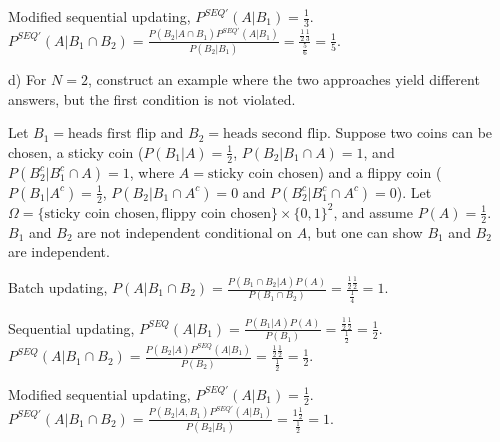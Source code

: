 \documentclass[12pt,english]{article}
\begin{document}
Modified sequential updating, $P^{SEQ'}(A | B_{1}) = \frac{1}{3}$. $P^{SEQ'}(A | B_{1} \cap B_{2}) = \frac{P(B_{2} | A \cap B_{1}) P^{SEQ'}(A | B_{1})}{P(B_{2} | B_{1})} = \frac{\frac{1}{2} \frac{1}{3}}{\frac{5}{6}} = \frac{1}{5}$.

\vspace{1em}

d) For $N = 2$, construct an example where the two approaches yield different answers, but the first condition is not violated.

\vspace{1em}

Let $B_{1} = \text{heads first flip}$ and $B_{2} = \text{heads second flip}$.  Suppose two coins can be chosen, a sticky coin ($P(B_{1} | A) = \frac{1}{2}$, $P(B_{2} | B_{1} \cap A) = 1$, and $P(B_{2}^{c} | B_{1}^{c} \cap A) = 1$, where $A = \text{sticky coin chosen}$) and a flippy coin ($P(B_{1} | A^{c}) = \frac{1}{2}$, $P(B_{2} | B_{1} \cap A^{c}) = 0$ and $P(B_{2}^{c} | B_{1}^{c} \cap A^{c}) = 0$). Let $\Omega = \{\text{sticky coin chosen}, \text{flippy coin chosen} \} \times \{0, 1\}^{2}$, and assume $P(A) = \frac{1}{2}$. $B_{1}$ and $B_{2}$ are not independent conditional on $A$, but one can show $B_{1}$ and $B_{2}$ are independent.

Batch updating, $P(A | B_{1} \cap B_{2}) = \frac{P(B_{1} \cap B_{2} | A) P(A)}{P(B_{1} \cap B_{2})} = \frac{\frac{1}{2} \frac{1}{2}}{\frac{1}{4}} = 1$.

Sequential updating, $P^{SEQ}(A | B_{1}) = \frac{P(B_{1} | A) P(A)}{P(B_{1})} = \frac{\frac{1}{2} \frac{1}{2}}{\frac{1}{2}} = \frac{1}{2}$. $P^{SEQ}(A | B_{1} \cap B_{2}) = \frac{P(B_{2} | A) P^{SEQ}(A | B_{1})}{P(B_{2})} = \frac{\frac{1}{2} \frac{1}{2}}{\frac{1}{2}} = \frac{1}{2}$.

Modified sequential updating, $P^{SEQ'}(A | B_{1}) = \frac{1}{2}$. $P^{SEQ'}(A | B_{1} \cap B_{2}) = \frac{P(B_{2} | A, B_{1}) P^{SEQ'}(A | B_{1})}{P(B_{2} | B_{1})} = \frac{1 \frac{1}{2}}{\frac{1}{2}} = 1$.
\end{document}
